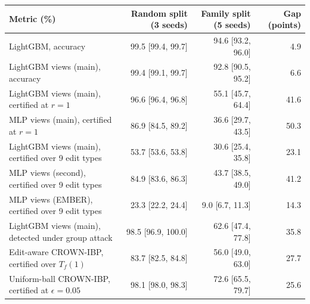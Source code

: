 \begin{tabular}{lrrr}
\toprule
Metric (\%) & Random split (3 seeds) & Family split (5 seeds) & Gap (points) \\
\midrule
LightGBM, accuracy & 99.5 [99.4, 99.7] & 94.6 [93.2, 96.0] & 4.9 \\
LightGBM views (main), accuracy & 99.4 [99.1, 99.7] & 92.8 [90.5, 95.2] & 6.6 \\
LightGBM views (main), certified at $r=1$ & 96.6 [96.4, 96.8] & 55.1 [45.7, 64.4] & 41.6 \\
MLP views (main), certified at $r=1$ & 86.9 [84.5, 89.2] & 36.6 [29.7, 43.5] & 50.3 \\
LightGBM views (main), certified over 9 edit types & 53.7 [53.6, 53.8] & 30.6 [25.4, 35.8] & 23.1 \\
MLP views (second), certified over 9 edit types & 84.9 [83.6, 86.3] & 43.7 [38.5, 49.0] & 41.2 \\
MLP views (EMBER), certified over 9 edit types & 23.3 [22.2, 24.4] & 9.0 [6.7, 11.3] & 14.3 \\
LightGBM views (main), detected under group attack & 98.5 [96.9, 100.0] & 62.6 [47.4, 77.8] & 35.8 \\
Edit-aware CROWN-IBP, certified over $T_f(1)$ & 83.7 [82.5, 84.8] & 56.0 [49.0, 63.0] & 27.7 \\
Uniform-ball CROWN-IBP, certified at $\epsilon=0.05$ & 98.1 [98.0, 98.3] & 72.6 [65.5, 79.7] & 25.6 \\
\bottomrule
\end{tabular}
